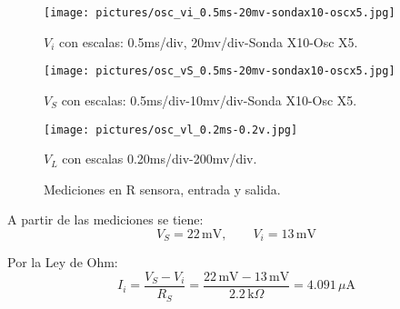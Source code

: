     \begin{figure}[!htbp]
      \centering
      \begin{minipage}[t]{0.32\textwidth}
        \centering
        \texttt{[image: pictures/osc\_vi\_0.5ms-20mv-sondax10-oscx5.jpg]}
        \caption*{\small $V_i$ con escalas: 0.5ms/div, 20mv/div-Sonda X10-Osc X5.}
      \end{minipage}\hfill
      \begin{minipage}[t]{0.32\textwidth}
        \centering
        \texttt{[image: pictures/osc\_vS\_0.5ms-20mv-sondax10-oscx5.jpg]}
        \caption*{\small $V_S$ con escalas: 0.5ms/div-10mv/div-Sonda X10-Osc X5.}
      \end{minipage}\hfill
      \begin{minipage}[t]{0.32\textwidth}
        \centering
        \texttt{[image: pictures/osc\_vl\_0.2ms-0.2v.jpg]}
        \caption*{\small $V_L$ con escalas 0.20ms/div-200mv/div.}
      \end{minipage}
      \caption{Mediciones en R sensora, entrada y salida.}
    \end{figure}
    

    \vspace{0.5cm}
    A partir de las mediciones se tiene:
    \[
    V_S = 22\,\text{mV}, \qquad V_i = 13\,\text{mV}
    \]

    Por la Ley de Ohm:
    \[
    I_i = \frac{V_S - V_i}{R_S}
         = \frac{22\,\text{mV} - 13\,\text{mV}}{2.2\,\text{k}\Omega}
         = 4.091\,\mu\text{A}
    \]

